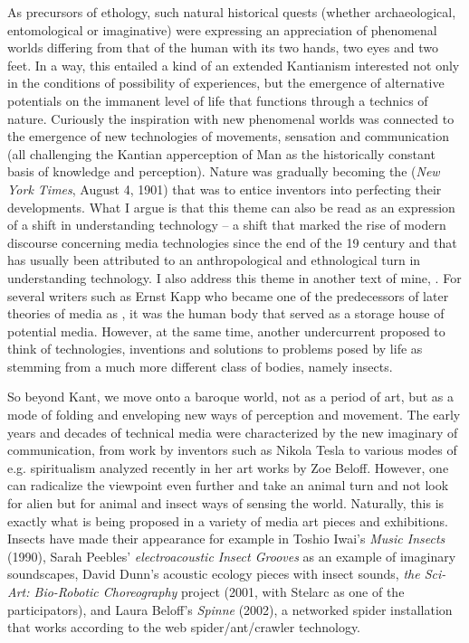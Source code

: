 {As precursors of ethology, such natural historical quests (whether
archaeological, entomological or imaginative) were expressing an
appreciation of phenomenal worlds differing from that of the human with
its two hands, two eyes and two feet. In a way, this entailed a kind of
an extended Kantianism interested not only in the conditions of
possibility of experiences, but the emergence of alternative potentials
on the immanent level of life that functions through a technics of
nature. Curiously the inspiration with new phenomenal worlds was
connected to the emergence of new technologies of movements, sensation
and communication (all challenging the Kantian apperception of Man as
the historically constant basis of knowledge and perception). Nature
was gradually becoming the  ({\em New
York Times}, August 4, 1901) that was to entice inventors into
perfecting their developments. What I argue is that this theme can also
be read as an expression of a shift in understanding technology {--} a
shift that marked the rise of modern discourse concerning media
technologies since the end of the 19 century and that has usually
been attributed to an anthropological and ethnological turn in
understanding technology. I also address this theme in another text of
mine, . For several writers such as Ernst Kapp who
became one of the predecessors of later theories of media as
, it was the human body that served as a storage
house of potential media. However, at the same time, another
undercurrent proposed to think of technologies, inventions and
solutions to problems posed by life as stemming from a much more
different class of bodies, namely insects. 

So beyond Kant, we move onto a baroque world, not as a period of art,
but as a mode of folding and enveloping new ways of perception and
movement. The early years and decades of technical media were
characterized by the new imaginary of communication, from work by
inventors such as Nikola Tesla to various modes of e.g. spiritualism
analyzed recently in her art works by Zoe Beloff. However, one can
radicalize the viewpoint even further and take an animal turn and not
look for alien but for animal and insect ways of sensing the world.
Naturally, this is exactly what is being proposed in a variety of media
art pieces and exhibitions. Insects have made their appearance for
example in Toshio Iwai's {\em Music Insects} (1990), Sarah Peebles'
{\em electroacoustic Insect Grooves} as an example of imaginary
soundscapes, David Dunn's acoustic ecology pieces with insect sounds,
{\em the Sci{}-Art: Bio{}-Robotic Choreography} project (2001, with
Stelarc as one of the participators), and Laura Beloff's
{\em Spinne} (2002), a networked spider installation that works
according to the web spider/ant/crawler technology.

}
